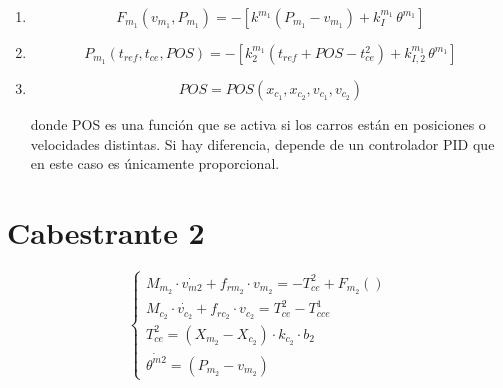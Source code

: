 \begin{enumerate}
    \item 
    \begin{equation}
    F_{m_1}(v_{m_1},P_{m_1}) = - \left[ k^{m_1} (P_{m_1} - v_{m_1}) + k^{m_1}_I \, \theta^{m_1} \right]
    \end{equation}

    \item 
    \begin{equation}
    P_{m_1}(t_{ref},t_{ce},POS) =
    - \left[ k^{m_1}_2 (t_{ref} + POS - t_{ce}^2) + k^{m_1}_{I,2} \, \theta^{m_1} \right]
    \end{equation}

    \item 
    \begin{equation}
    POS = POS(x_{c_1},x_{c_2},v_{c_1},v_{c_2})
    \end{equation}

    donde POS es una función que se activa si los carros están en posiciones o velocidades distintas. 
    Si hay diferencia, depende de un controlador PID que en este caso es únicamente proporcional.
\end{enumerate}

\section{Cabestrante 2}

\begin{equation}
\begin{cases} 

    M_{m_2} \cdot \dot{v_{m2}} + f_{rm_2} \cdot v_{m_2} = - T_{ce}^2 + F_{m_2}() \\
    M_{c_2} \cdot \dot{v_{c_2}} + f_{rc_2} \cdot v_{c_2} = T_{ce}^2 - T_{cce}^1 \\
    T_{ce}^2 = (X_{m_2} - X_{c_2}) \cdot k_{c_2} \cdot b_2 \\
    \dot{\theta ^{m2}} = (P_{m_2} - v_{m_2})

\end{cases}
\end{equation}

